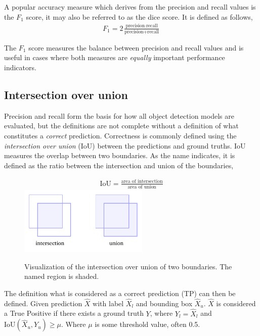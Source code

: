 A popular accuracy measure which derives from the precision and recall values is the \(F_1\) score, it may also be referred to as the dice score.
It is defined as follows,
%
\begin{align*}
  F_1=2\frac{\text{precision}\cdot\text{recall}}{\text{precision}+\text{recall}}
\end{align*}

The \(F_1\) score measures the balance between precision and recall values and is useful in cases where both measures are \textit{equally} important performance indicators.

\subsection{Intersection over union}
Precision and recall form the basis for how all object detection models are evaluated, but the definitions are not complete without a definition of what constitutes a \textit{correct} prediction.
Correctness is commonly defined using the \textit{intersection over union} (IoU) between the predictions and ground truths.
IoU measures the overlap between two boundaries.
As the name indicates, it is defined as the ratio between the intersection and union of the boundaries,

\begin{figure}[htb]
  \centering
  \begin{gather*}
    \text{IoU}=\frac{\text{area of intersection}}{\text{area of union}}
  \end{gather*}
  \includegraphics[width=0.55\textwidth]{figs/background/iou.pdf}
\caption[Intersection over union]{Visualization of the intersection over union of two boundaries.
The named region is shaded.}\label{fig:iou}
\end{figure}

The definition what is considered as a correct prediction (TP) can then be defined.
Given prediction \(\hat{X}\) with label \(\hat{X}_l\) and bounding box \(\hat{X}_u\). \(\hat{X}\) is considered a True Positive if there exists a ground truth \(Y\), where \(Y_{l}=\hat{X}_l\) and \(\text{IoU}(\hat{X}_u, Y_{u})\ge \mu \).
Where \( \mu \) is some threshold value, often 0.5.

